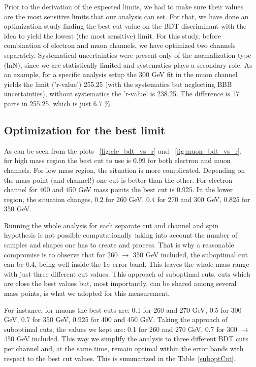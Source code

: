 Prior to the derivation of the expected limits, we had to make sure their values are the most sensitive limits that our analysis can set. For that, we have done an optimization study finding the best cut value on the BDT discriminant with the idea to yield the lowest (the most sensitive) limit. For this study, before combination of electron and muon channels, we have optimized two channels separately. Systematical uncertainties were present only of the normalization type (lnN), since we are statistically limited and systematics plays a secondary role. %
As an example, for a specific analysis setup the 300 GeV fit in the muon channel yields the limit ('r-value') 255.25 (with the systematics but neglecting BBB uncertainties), without systematics the 'r-value' is 238.25. The difference is 17 parts in 255.25, which is just 6.7 $\%$.

\subsection{Optimization for the best limit}

As can be seen from the plots ~\ref{fig:ele_bdt_vs_r} and ~\ref{fig:muon_bdt_vs_r}, for high mass region the best cut to use is 0.99 for both electron and muon channels. For low mass region, the situation is more complicated. Depending on the mass point (and channel!) one cut is better than the other. For electron channel for 400 and 450 GeV mass points the best cut is 0.925. In the lower region, the situation changes, 0.2 for 260 GeV, 0.4 for 270 and 300 GeV, 0.825 for 350 GeV. 

Running the whole analysis for each separate cut and channel and spin hypothesis is not possible computationally taking into account the number of samples and shapes one has to create and process. That is why a reasonable compromise is to observe that for 260 $\to$ 350 GeV included, the suboptimal cut can be 0.4, being well inside the $1\sigma$ error band. This leaves the whole mass range with just three different cut values. This approach of suboptimal cuts, cuts which are close the best values but, most importantly, can be shared among several mass points, is what we adopted for this measurement. 

For instance, for muons the best cuts are: 0.1 for 260 and 270 GeV, 0.5 for 300 GeV, 0.7 for 350 GeV, 0.925 for 400 and 450 GeV. Taking the approach of suboptimal cuts, the values we kept are: 0.1 for 260 and 270 GeV, 0.7 for 300 $\to$ 450 GeV included. This way we simplify the analysis to three different BDT cuts per channel and, at the same time, remain optimal within the error bands with respect to the best cut values. This is summarized in the Table~\ref{suboptCut}.

